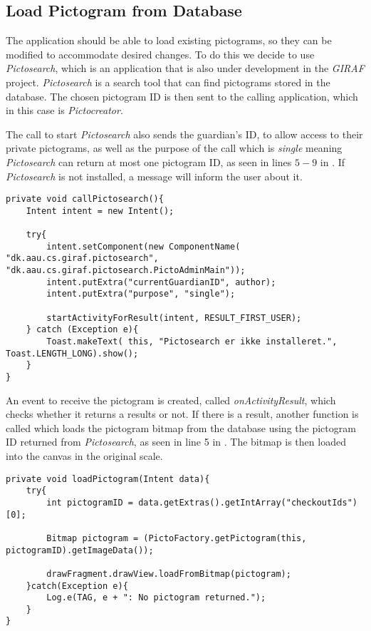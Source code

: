 \subsection{Load Pictogram from Database}
The application should be able to load existing pictograms, so they can be modified to accommodate desired changes.
To do this we decide to use \textit{Pictosearch}, which is an application that is also under development in the \textit{GIRAF} project.
\textit{Pictosearch} is a search tool that can find pictograms stored in the database.
The chosen pictogram ID is then sent to the calling application, which in this case is \textit{Pictocreator}.

The call to start \textit{Pictosearch} also sends the guardian's ID, to allow access to their private pictograms, as well as the purpose of the call which is \textit{single} meaning \textit{Pictosearch} can return at most one pictogram ID, as seen in lines $5-9$ in .
If \textit{Pictosearch} is not installed, a message will inform the user about it.

\begin{lstlisting}[caption=Method used to launch \textit{Pictosearch}., label=lst:callPictosearch]
private void callPictosearch(){
    Intent intent = new Intent();

    try{
        intent.setComponent(new ComponentName( "dk.aau.cs.giraf.pictosearch",  "dk.aau.cs.giraf.pictosearch.PictoAdminMain"));
        intent.putExtra("currentGuardianID", author);
        intent.putExtra("purpose", "single");

        startActivityForResult(intent, RESULT_FIRST_USER);
    } catch (Exception e){
        Toast.makeText( this, "Pictosearch er ikke installeret.", Toast.LENGTH_LONG).show();
    }
}
\end{lstlisting}

An event to receive the pictogram is created, called \textit{onActivityResult}, which checks whether it returns a results or not.
If there is a result, another function is called which loads the pictogram bitmap from the database using the pictogram ID returned from \textit{Pictosearch}, as seen in line 5 in  .
The bitmap is then loaded into the canvas in the original scale.

\newpage
\begin{lstlisting}[caption=Method to load a pictogram from Id received from \textit{Pictosearch}., label=lst:loadPictogram]
private void loadPictogram(Intent data){
    try{
        int pictogramID = data.getExtras().getIntArray("checkoutIds")[0];

        Bitmap pictogram = (PictoFactory.getPictogram(this, pictogramID).getImageData());

        drawFragment.drawView.loadFromBitmap(pictogram);
    }catch(Exception e){
        Log.e(TAG, e + ": No pictogram returned.");
    }
}
\end{lstlisting}
